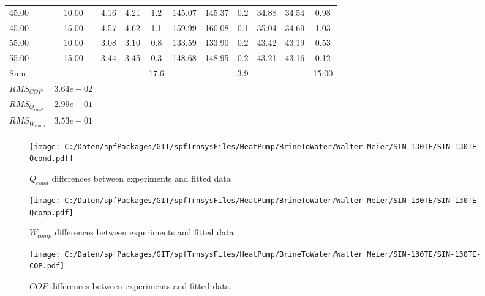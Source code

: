 \documentclass[english]{SPFShortReport}
\begin{document}
\begin{table}[!ht]
\begin{small}
\begin{center}
{\begin{tabular}{l | c c c c c c c c c c }
45.00  & 10.00 & 4.16 & 4.21 & 1.2 & 145.07 & 145.37 & 0.2 & 34.88 & 34.54 & 0.98\\ 
45.00  & 15.00 & 4.57 & 4.62 & 1.1 & 159.99 & 160.08 & 0.1 & 35.04 & 34.69 & 1.03\\ 
55.00  & 10.00 & 3.08 & 3.10 & 0.8 & 133.59 & 133.90 & 0.2 & 43.42 & 43.19 & 0.53\\ 
55.00  & 15.00 & 3.44 & 3.45 & 0.3 & 148.68 & 148.95 & 0.2 & 43.21 & 43.16 & 0.12\\ 
\hline 
 Sum &  & &  & 17.6 &  &  & 3.9 & &  & 15.00\\ 
\hline 
 $RMS_{COP}$ & $3.64e-02$ \\ 
 $RMS_{Q_{cond}}$ & $2.99e-01$ \\ 
 $RMS_{W_{comp}}$ & $3.53e-01$ \\ 
\hline
\hline
\end{tabular}
}
\label{ErrorsTable}
\end{center}
\end{small}
\end{table}
\begin{figure}[!ht]
\begin{center}
\texttt{[image: C:/Daten/spfPackages/GIT/spfTrnsysFiles/HeatPump/BrineToWater/Walter Meier/SIN-130TE/SIN-130TE-Qcond.pdf]}
\caption{$Q_{cond}$ differences between experiments and fitted data}
\label{QcongFig}
\end{center}
\end{figure}
\begin{figure}[!ht]
\begin{center}
\texttt{[image: C:/Daten/spfPackages/GIT/spfTrnsysFiles/HeatPump/BrineToWater/Walter Meier/SIN-130TE/SIN-130TE-Qcomp.pdf]}
\caption{$W_{comp}$ differences between experiments and fitted data}
\label{QcompFig}
\end{center}
\end{figure}
\begin{figure}[!ht]
\begin{center}
\texttt{[image: C:/Daten/spfPackages/GIT/spfTrnsysFiles/HeatPump/BrineToWater/Walter Meier/SIN-130TE/SIN-130TE-COP.pdf]}
\caption{$COP$ differences between experiments and fitted data}
\label{COPFig}
\end{center}
\end{figure}
\end{document}
